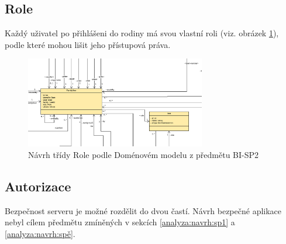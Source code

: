         \subsection{Role}\label{analyza:bezpecnost:role}
    
        Každý uživatel po přihlášeni do rodiny má svou vlastní roli (viz. obrázek \ref{image:Role1}), podle které mohou lišit jeho přístupová práva. 
        \begin{figure}\centering
	        \includegraphics[width=0.7\textwidth]{pdfs/Role1}
	        \caption[Návrh Rolí]{Návrh třídy Role podle Doménovém modelu z předmětu BI-SP2}\label{image:Role1}
        \end{figure}
    
        \subsection{Autorizace}
            Bezpečnost serveru je možné rozdělit do dvou častí. 
            Návrh bezpečné aplikace nebyl cílem předmětu zmíněných v sekcích \ref{analyza:navrh:sp1} a \ref{analyza:navrh:spě}.